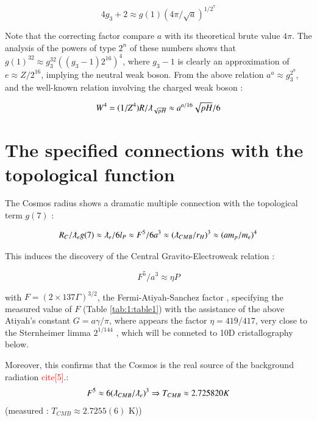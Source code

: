 \documentclass[a4paper,9pt]{article}
\begin{document}
\begin{equation}
4g_3 +2  \approx g(1) (4\pi/\sqrt a)^{1/2^7} 
\end{equation}

Note that the correcting factor compare $a$ with its theoretical brute value $4\pi$. The analysis of the powers of type $2^n$ of these numbers shows that $g(1)^{32} \approx g_3^{32}((g_3 - 1) 2^{16})^4$, where $g_3 - 1$ is clearly an approximation of $e \approx Z/2^{16}$, implying the neutral weak boson. From the above relation $ a^a \approx g_3^{2^9}$, and the well-known relation involving the charged weak boson \cite{Sanchez}:

\begin{equation}
W^4 = (1/Z^4)R/\lambdabar_{\sqrt{pH}} \approx a^{a/16} \sqrt{pH}/6  
\end{equation}








\section{The specified connections with the topological function}

The Cosmos radius shows a dramatic multiple connection with the topological term $g(7)$ :

\begin{equation}
R_{C}/\lambdabar_{e} g(7) \approx  \lambdabar_{e}/6l_P \approx F^5/6a^3 \approx (\lambdabar_{CMB}/r_H)^3 \approx  (am_p/m_e)^4  
\end{equation}

This induces the discovery of the Central Gravito-Electroweak relation :

\begin{equation*}
F^5/a^3 \approx \eta P    
\end{equation*}{}
  

with  $F = (2\times 137 \Gamma)^{3/2}$, the Fermi-Atiyah-Sanchez factor \cite{Sanchez}, specifying the measured value of  $F$ (Table \ref{tab:1:table1}) with the assistance of the above Atiyah's constant $G = a \gamma/ \pi$, where appears the factor $\eta = 419/417$, very close to the Sternheimer limma $2^{1/144}$ \cite{Sternheimer}, which will be conneted to 10D cristallography below.


Moreover, this confirms that the Cosmos is the real source of the background radiation \textcolor{red}{cite{[5]}}.:
\begin{equation}
F^5  \approx 6(\lambdabar_{CMB}/\lambdabar_{e})^3 \Rightarrow  T_{CMB}  \approx  2.725820 K  
\end{equation}
(measured : $T_{CMB}  \approx  2.7255(6)$ K))
\end{document}
